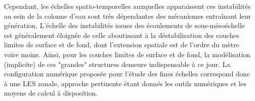 
Cependant, les échelles spatio-temporelles auxquelles apparaissent ces instabilités au sein de la colonne d'eau sont très dépendantes des mécanismes entraînant leur génération. L'échelle des instabilités issues des écoulements de sous-mésoéchelle est généralement éloignée de celle aboutissant à la déstabilisation des couches limites de surface et de fond, dont l'extension spatiale est de l'ordre du mètre voire moins. %
Ainsi, pour les couches limites de surface et de fond, la modélisation (implicite) de ces "grandes" structures demeure indispensable à ce jour. La configuration numérique proposée pour l'étude des fines échelles correspond donc à une LES zonale, approche pertinente étant donnés les outils numériques et les moyens de calcul à disposition.\\


